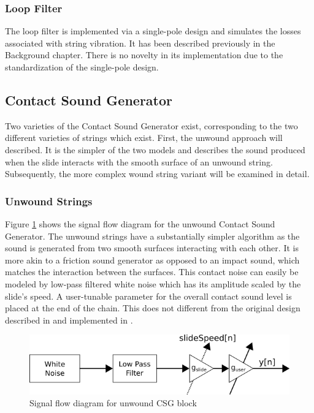 \documentclass[../main.tex]{subfiles}
\begin{document}
\subsubsection{Loop Filter}
The loop filter is implemented via a single-pole design and simulates the losses associated with string vibration. It has been described previously in the Background chapter. There is no novelty in its implementation due to the standardization of the single-pole design.

\subsection{Contact Sound Generator}
Two varieties of the Contact Sound Generator exist, corresponding to the two different varieties of strings which exist. First, the unwound approach will described. It is the simpler of the two models and describes the sound produced when the slide interacts with the smooth surface of an unwound string. Subsequently, the more complex wound string variant will be examined in detail.

\subsubsection{Unwound Strings}
Figure \ref{fig:CSG_unwound} shows the signal flow diagram for the unwound Contact Sound Generator. The unwound strings have a substantially simpler algorithm as the sound is generated from two smooth surfaces interacting with each other. It is more akin to a friction sound generator as opposed to an impact sound, which matches the interaction between the surfaces. This contact noise can easily be modeled by low-pass filtered white noise which has its amplitude scaled by the slide's speed. A user-tunable parameter for the overall contact sound level is placed at the end of the chain. This does not different from the original design described in  and implemented in .

\begin{figure}[h]
    \centering
    \includegraphics[scale=.5]{./images/diagrams/CSG_unwound.png}
    \caption{Signal flow diagram for unwound CSG block}
    \label{fig:CSG_unwound}
\end{figure}
\end{document}
